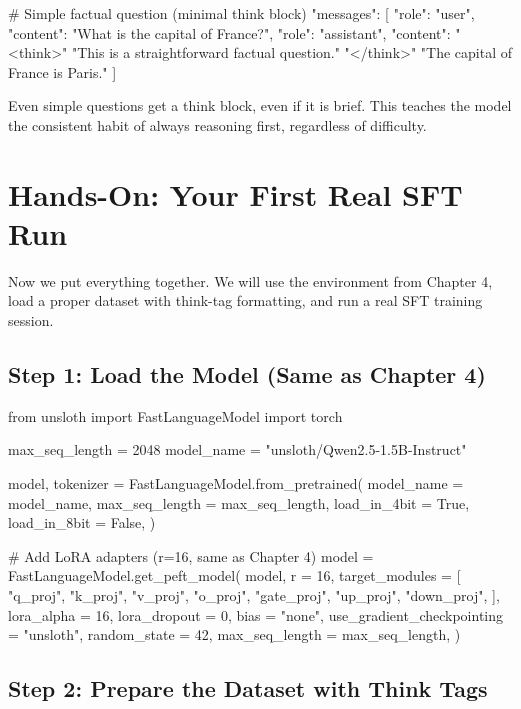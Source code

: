 \begin{chapterenv}
\begin{codeblock}[python]
# Simple factual question (minimal think block)
{
    "messages": [
        {"role": "user", "content": "What is the capital of France?"},
        {"role": "assistant", "content":
         "<think>\n"
         "This is a straightforward factual question.\n"
         "</think>\n"
         "The capital of France is Paris."}
    ]
}
\end{codeblock}

\begin{tipbox}
Even simple questions get a think block, even if it is brief. This teaches the model the consistent habit of always reasoning first, regardless of difficulty.
\end{tipbox}

\section{Hands-On: Your First Real SFT Run}

Now we put everything together. We will use the environment from Chapter 4, load a proper dataset with think-tag formatting, and run a real SFT training session.

\subsection{Step 1: Load the Model (Same as Chapter 4)}

\begin{codeblock}[python]
from unsloth import FastLanguageModel
import torch

max_seq_length = 2048
model_name = "unsloth/Qwen2.5-1.5B-Instruct"

model, tokenizer = FastLanguageModel.from_pretrained(
    model_name = model_name,
    max_seq_length = max_seq_length,
    load_in_4bit = True,
    load_in_8bit = False,
)

# Add LoRA adapters (r=16, same as Chapter 4)
model = FastLanguageModel.get_peft_model(
    model,
    r = 16,
    target_modules = [
        "q_proj", "k_proj", "v_proj", "o_proj",
        "gate_proj", "up_proj", "down_proj",
    ],
    lora_alpha = 16,
    lora_dropout = 0,
    bias = "none",
    use_gradient_checkpointing = "unsloth",
    random_state = 42,
    max_seq_length = max_seq_length,
)
\end{codeblock}

\subsection{Step 2: Prepare the Dataset with Think Tags}


\end{chapterenv}
